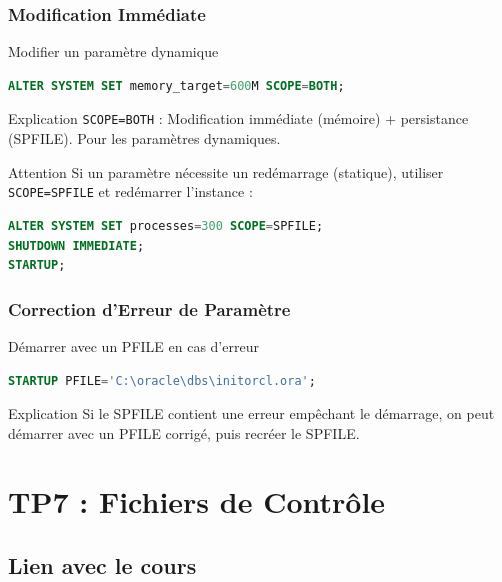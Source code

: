 \documentclass[12pt,a4paper]{article}
\begin{document}
\subsubsection{Modification Immédiate}

\begin{commande}{Modifier un paramètre dynamique}
\begin{lstlisting}[language=SQL]
ALTER SYSTEM SET memory_target=600M SCOPE=BOTH;
\end{lstlisting}
\end{commande}

\begin{explication}{Explication}
\texttt{SCOPE=BOTH} : Modification immédiate (mémoire) + persistance (SPFILE). Pour les paramètres dynamiques.
\end{explication}

\begin{attention}{Attention}
Si un paramètre nécessite un redémarrage (statique), utiliser \texttt{SCOPE=SPFILE} et redémarrer l'instance :
\begin{lstlisting}[language=SQL]
ALTER SYSTEM SET processes=300 SCOPE=SPFILE;
SHUTDOWN IMMEDIATE;
STARTUP;
\end{lstlisting}
\end{attention}

\subsubsection{Correction d'Erreur de Paramètre}

\begin{commande}{Démarrer avec un PFILE en cas d'erreur}
\begin{lstlisting}[language=SQL]
STARTUP PFILE='C:\oracle\dbs\initorcl.ora';
\end{lstlisting}
\end{commande}

\begin{explication}{Explication}
Si le SPFILE contient une erreur empêchant le démarrage, on peut démarrer avec un PFILE corrigé, puis recréer le SPFILE.
\end{explication}

\section{TP7 : Fichiers de Contrôle}

\subsection{Lien avec le cours}
\end{document}
